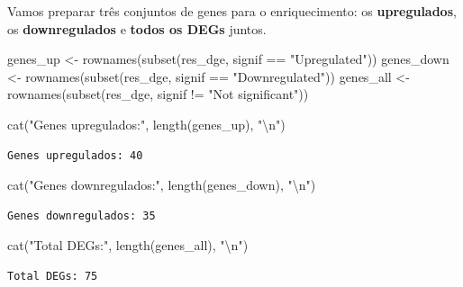\documentclass[
  letterpaper,
  DIV=11,
  numbers=noendperiod]{scrreprt}
\newenvironment{Shaded}{\begin{snugshade}}{\end{snugshade}}
\newcommand{\FunctionTok}[1]{\textcolor[rgb]{0.28,0.35,0.67}{#1}}
\newcommand{\NormalTok}[1]{\textcolor[rgb]{0.00,0.23,0.31}{#1}}
\newcommand{\OtherTok}[1]{\textcolor[rgb]{0.00,0.23,0.31}{#1}}
\newcommand{\SpecialCharTok}[1]{\textcolor[rgb]{0.37,0.37,0.37}{#1}}
\newcommand{\StringTok}[1]{\textcolor[rgb]{0.13,0.47,0.30}{#1}}
\begin{document}
Vamos preparar três conjuntos de genes para o enriquecimento: os
\textbf{upregulados}, os \textbf{downregulados} e \textbf{todos os DEGs}
juntos.

\begin{Shaded}
\begin{Highlighting}[]
\NormalTok{genes\_up }\OtherTok{\textless{}{-}} \FunctionTok{rownames}\NormalTok{(}\FunctionTok{subset}\NormalTok{(res\_dge, signif }\SpecialCharTok{==} \StringTok{"Upregulated"}\NormalTok{))}
\NormalTok{genes\_down }\OtherTok{\textless{}{-}} \FunctionTok{rownames}\NormalTok{(}\FunctionTok{subset}\NormalTok{(res\_dge, signif }\SpecialCharTok{==} \StringTok{"Downregulated"}\NormalTok{))}
\NormalTok{genes\_all }\OtherTok{\textless{}{-}} \FunctionTok{rownames}\NormalTok{(}\FunctionTok{subset}\NormalTok{(res\_dge, signif }\SpecialCharTok{!=} \StringTok{"Not significant"}\NormalTok{))}

\FunctionTok{cat}\NormalTok{(}\StringTok{"Genes upregulados:"}\NormalTok{, }\FunctionTok{length}\NormalTok{(genes\_up), }\StringTok{"}\SpecialCharTok{\textbackslash{}n}\StringTok{"}\NormalTok{)}
\end{Highlighting}
\end{Shaded}

\begin{verbatim}
Genes upregulados: 40 
\end{verbatim}

\begin{Shaded}
\begin{Highlighting}[]
\FunctionTok{cat}\NormalTok{(}\StringTok{"Genes downregulados:"}\NormalTok{, }\FunctionTok{length}\NormalTok{(genes\_down), }\StringTok{"}\SpecialCharTok{\textbackslash{}n}\StringTok{"}\NormalTok{)}
\end{Highlighting}
\end{Shaded}

\begin{verbatim}
Genes downregulados: 35 
\end{verbatim}

\begin{Shaded}
\begin{Highlighting}[]
\FunctionTok{cat}\NormalTok{(}\StringTok{"Total DEGs:"}\NormalTok{, }\FunctionTok{length}\NormalTok{(genes\_all), }\StringTok{"}\SpecialCharTok{\textbackslash{}n}\StringTok{"}\NormalTok{)}
\end{Highlighting}
\end{Shaded}

\begin{verbatim}
Total DEGs: 75 
\end{verbatim}
\end{document}
